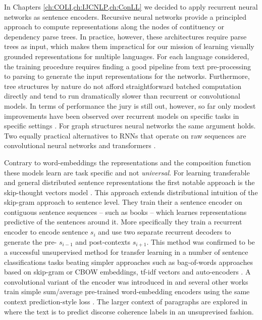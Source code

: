 In Chapters \ref{ch:COLI,ch:IJCNLP,ch:ConLL} we decided to apply
recurrent neural networks as sentence encoders.
Recursive neural networks provide a principled approach to
compute representations along the nodes of contituency
\cite{socher2013recursive} or dependency \cite{socher2014grounded} parse trees.
In practice, however, these architectures require parse trees as input,
which makes them impractical for our mission of learning visually grounded
representations for multiple languages.
For each language considered, the training procedure requires finding a good
pipeline from text pre-processing to parsing to generate the input representations
for the networks. Furthermore, tree structures by nature do not
afford straightforward batched computation directly and tend to run dramatically
slower than recurrent or convolutional models. In terms of performance the jury
is still out, however, so far only modest improvements have been observed
over recurrent models on specific tasks in specific settings
\cite{li2015tree,tai2015improved}. For graph structures neural networks the
same argument holds. Two equally practical alternatives to RNNs
that operate on raw sequences are convolutional neural networks
\cite{bai2018empirical} and transformers \cite{vaswani2017attention}.


Contrary to word-embeddings the representations
and the composition function these models learn are task specific and not \emph{universal}.
For learning transferable and general distributed sentence representations the first notable approach is the
skip-thought vectors model \cite{kiros2015skip}. This approach extends distributional intuition
of the skip-gram approach to sentence level. They train their a sentence encoder on contiguous sentence sequences
-- such as books -- which learnes representations predictive of the sentences around it. More specifically
they train a recurrent encoder to encode sentence $s_i$ and use two separate recurrent decoders to
generate the pre- $s_{i-1}$ and post-contexts $s_{i+1}$.
This method was confirmed to be a successful unsupervised method for transfer learning in a number of sentence
classifications tasks beating simpler approaches such as bag-of-words approaches based on skip-gram
or CBOW embeddings, tf-idf vectors and auto-encoders \cite{hill2016learning}. A convolutional
variant of the encoder was introduced in \cite{gan2016unsupervised} and several other works
train simple sum/average pre-trained word-embedding encoders using the same context prediction-style
loss \cite{kenter2016siamese,hill2016learning}. The larger context of paragraphs are
explored in \cite{jernite2017discourse} where the text is to predict discorse coherence
labels in an unsuprevised fashion.

